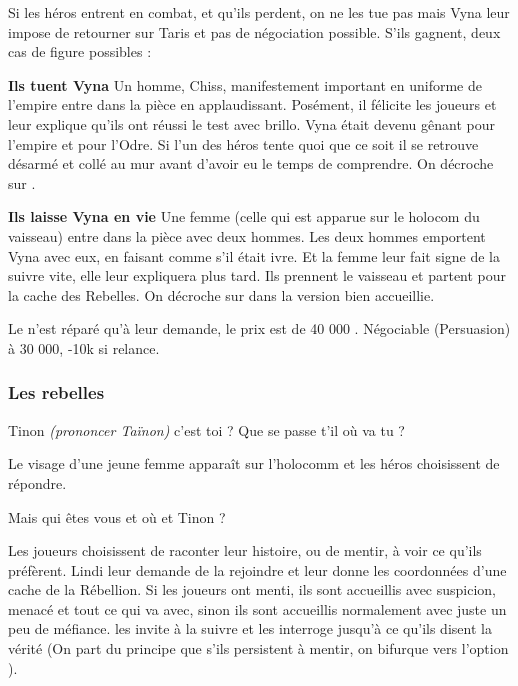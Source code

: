 Si les héros entrent en combat, et qu’ils perdent, on ne les tue pas mais Vyna leur impose de retourner sur Taris et pas de négociation possible. S’ils gagnent, deux cas de figure possibles :
\begin{rebelist}
    \item \textbf{Ils tuent Vyna} Un homme, Chiss, manifestement important en uniforme de l’empire entre dans la pièce en applaudissant. Posément, il félicite les joueurs et leur explique qu’ils ont réussi le test avec brillo. Vyna était devenu gênant pour l’empire et pour l’Odre. Si l’un des héros tente quoi que ce soit il se retrouve désarmé et collé au mur avant d’avoir eu le temps de comprendre. On décroche sur .

    \item \textbf{Ils laisse Vyna en vie} Une femme (celle qui est apparue sur le holocom du vaisseau) entre dans la pièce avec deux hommes. Les deux hommes emportent Vyna avec eux, en faisant comme s’il était ivre. Et la femme leur fait signe de la suivre vite, elle leur expliquera plus tard. Ils prennent le vaisseau et partent pour la cache des Rebelles. On décroche sur  dans la version bien accueillie.
\end{rebelist}

Le  n’est réparé qu’à leur demande, le prix est de 40 000 \crg. Négociable (Persuasion) à 30 000, -10k si relance.


\subsubsection{Les rebelles} \label{sec:les-rebelles}

\begin{quotebox}
    Tinon \emph{(prononcer Taïnon)} c’est toi ? Que se passe t’il où va tu ?
\end{quotebox}

Le visage d’une jeune femme apparaît sur l’holocomm et les héros choisissent de répondre.

\begin{quotebox}
    Mais qui êtes vous et où et Tinon ?
\end{quotebox}
Les joueurs choisissent de raconter leur histoire, ou de mentir, à voir ce qu’ils préfèrent. Lindi leur demande de la rejoindre et leur donne les coordonnées d’une cache de la Rébellion. Si les joueurs ont menti, ils sont accueillis avec suspicion, menacé et tout ce qui va avec, sinon ils sont accueillis normalement avec juste un peu de méfiance.  les invite à la suivre et les interroge jusqu’à ce qu’ils disent la vérité (On part du principe que s’ils persistent à mentir, on bifurque vers l’option ).

